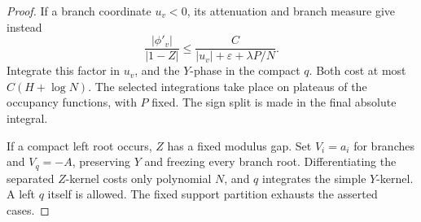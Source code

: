 \documentclass[11pt]{article}
\numberwithin{equation}{section}
\theoremstyle{definition}
\newcommand{\eps}{\varepsilon}
\begin{document}
\begin{proof}
If a branch coordinate \(u_v<0\), its attenuation and branch measure
give instead
\[
 \frac{|\phi'_v|}{|1-Z|}
 \le\frac C{|u_v|+\eps+\lambda P/N}.
\]
Integrate this factor in \(u_v\), and the \(Y\)-phase in the compact
\(q\). Both cost at most \(C(H+\log N)\).
The selected integrations take place on plateaus of the occupancy
functions, with \(P\) fixed. The sign split is made in the final
absolute integral.

If a compact left root occurs, \(Z\) has a fixed modulus gap.
Set \(V_i=a_i\) for branches and \(V_q=-A\), preserving \(Y\)
and freezing every branch root. Differentiating the separated
\(Z\)-kernel costs only polynomial \(N\), and \(q\) integrates
the simple \(Y\)-kernel. A left \(q\) itself is allowed.
The fixed support partition exhausts the asserted cases.
\end{proof}
\end{document}
